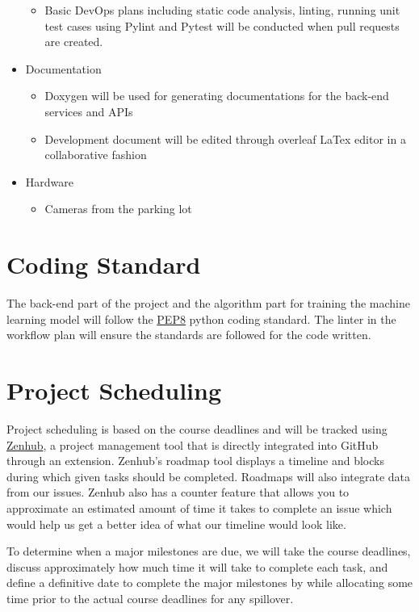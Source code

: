 \documentclass[12pt,letterpaper]{article}
\begin{document}
\begin{itemize}
    \begin{itemize}
        \item Basic DevOps plans including static code analysis, linting,
        running unit test cases using Pylint and Pytest will be conducted when
        pull requests are created.
    \end{itemize}
    \item Documentation
    \begin{itemize}
        \item Doxygen will be used for generating documentations for the
        back-end services and APIs
        \item Development document will be edited through overleaf LaTex editor
        in a collaborative fashion
    \end{itemize}
    \item Hardware
    \begin{itemize}
        \item Cameras from the parking lot 
    \end{itemize}
\end{itemize}

\section{Coding Standard}
The back-end part of the project and the algorithm part for training the machine
learning model will follow the \href{https://peps.python.org/pep-0008/} {PEP8}
python coding standard. The linter in the workflow plan will ensure the
standards are followed for the code written.

\section{Project Scheduling}
Project scheduling is based on the course deadlines and will be tracked using
\href{https://www.zenhub.com/}{Zenhub}, a project management tool that is
directly integrated into GitHub through an extension. Zenhub's roadmap tool
displays a timeline and blocks during which given tasks should be completed.
Roadmaps will also integrate data from our issues. Zenhub also has a counter
feature that allows you to approximate an estimated amount of time it takes to
complete an issue which would help us get a better idea of what our timeline
would look like.

To determine when a major milestones are due, we will take the course deadlines,
discuss approximately how much time it will take to complete each task, and
define a definitive date to complete the major milestones by while allocating
some time prior to the actual course deadlines for any spillover.
\end{document}
